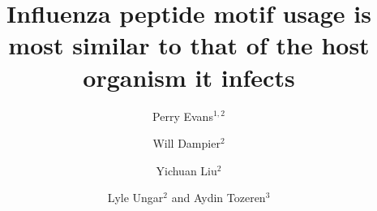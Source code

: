 \documentclass[10pt]{bmc_article}
\newenvironment{bmcformat}{\begin{raggedright}\baselineskip20pt\sloppy\setboolean{publ}{false}}{\end{raggedright}\baselineskip20pt\sloppy}
\begin{document}
\begin{bmcformat}

\title{Influenza peptide motif usage is most similar to that of the host
  organism it infects}
 

\author{Perry Evans\correspondingauthor$^{1,2}$%
      \and
         Will Dampier\correspondingauthor$^2$%
          \and
         Yichuan Liu\correspondingauthor$^2$%
          \and
         Lyle Ungar\correspondingauthor$^2$%
       and 
         Aydin Tozeren$^3$%
      }
      

\address{%
    \iid(1)Life Sciences Department, Kings College London, Cornwall House,%
        Waterloo Road, London, UK\\
    \iid(2)Department of Zoology, Cambridge, Waterloo Road, London, UK\\
    \iid(3)Marine Ecology Department, Institute of Marine Sciences Kiel, %
        D\"{u}sternbrooker Weg 20, 24105 Kiel, Germany
}%

\maketitle



\end{bmcformat}
\end{document}
